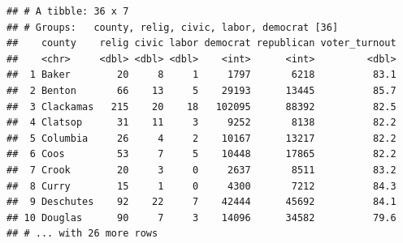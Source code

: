 \documentclass[
  english,
  man]{apa6}
\begin{document}
\begin{verbatim}
## # A tibble: 36 x 7
## # Groups:   county, relig, civic, labor, democrat [36]
##    county    relig civic labor democrat republican voter_turnout
##    <chr>     <dbl> <dbl> <dbl>    <int>      <int>         <dbl>
##  1 Baker        20     8     1     1797       6218          83.1
##  2 Benton       66    13     5    29193      13445          85.7
##  3 Clackamas   215    20    18   102095      88392          82.5
##  4 Clatsop      31    11     3     9252       8138          82.2
##  5 Columbia     26     4     2    10167      13217          82.2
##  6 Coos         53     7     5    10448      17865          82.2
##  7 Crook        20     3     0     2637       8511          83.2
##  8 Curry        15     1     0     4300       7212          84.3
##  9 Deschutes    92    22     7    42444      45692          84.1
## 10 Douglas      90     7     3    14096      34582          79.6
## # ... with 26 more rows
\end{verbatim}
\end{document}
